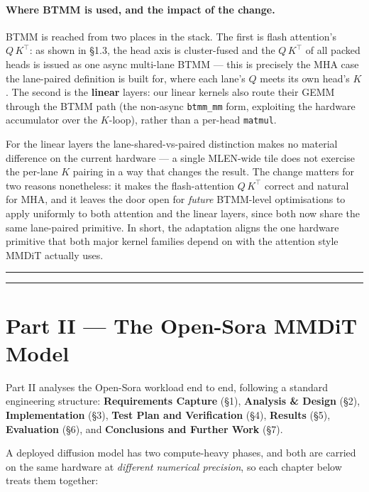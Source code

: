 \documentclass[
  10pt,
]{article}
\newcounter{none} %
\begin{document}
\paragraph{Where BTMM is used, and the impact of the change.} BTMM is
reached from two places in the stack. The first is flash attention's
\(Q\,K^{\!\top}\): as shown in §1.3, the head axis is cluster-fused and
the \(Q\,K^{\!\top}\) of all packed heads is issued as one async
multi-lane BTMM --- this is precisely the MHA case the lane-paired
definition is built for, where each lane's \(Q\) meets its own head's
\(K\). The second is the \textbf{linear} layers: our linear kernels also
route their GEMM through the BTMM path (the non-async \texttt{btmm\_mm}
form, exploiting the hardware accumulator over the \(K\)-loop), rather
than a per-head \texttt{matmul}.

For the linear layers the lane-shared-vs-paired distinction makes no
material difference on the current hardware --- a single MLEN-wide tile
does not exercise the per-lane \(K\) pairing in a way that changes the
result. The change matters for two reasons nonetheless: it makes the
flash-attention \(Q\,K^{\!\top}\) correct and natural for MHA, and it
leaves the door open for \emph{future} BTMM-level optimisations to apply
uniformly to both attention and the linear layers, since both now share
the same lane-paired primitive. In short, the adaptation aligns the one
hardware primitive that both major kernel families depend on with the
attention style MMDiT actually uses.

\begin{center}\rule{0.5\linewidth}{0.5pt}\end{center}

\begin{center}\rule{0.5\linewidth}{0.5pt}\end{center}

\section{Part II --- The Open-Sora MMDiT Model}\label{part-model}

Part II analyses the Open-Sora workload end to end, following a standard
engineering structure: \textbf{Requirements Capture} (§1),
\textbf{Analysis \& Design} (§2), \textbf{Implementation} (§3),
\textbf{Test Plan and Verification} (§4), \textbf{Results} (§5),
\textbf{Evaluation} (§6), and \textbf{Conclusions and Further Work} (§7).

A deployed diffusion model has two compute-heavy phases, and both are
carried on the same hardware at \emph{different numerical precision}, so
each chapter below treats them together:
\end{document}
